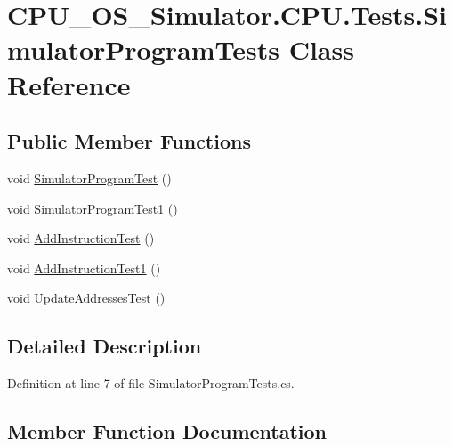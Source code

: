 \hypertarget{class_c_p_u___o_s___simulator_1_1_c_p_u_1_1_tests_1_1_simulator_program_tests}{}\section{C\+P\+U\+\_\+\+O\+S\+\_\+\+Simulator.\+C\+P\+U.\+Tests.\+Simulator\+Program\+Tests Class Reference}
\label{class_c_p_u___o_s___simulator_1_1_c_p_u_1_1_tests_1_1_simulator_program_tests}
\subsection*{Public Member Functions}
\begin{DoxyCompactItemize}
\item 
void \hyperlink{class_c_p_u___o_s___simulator_1_1_c_p_u_1_1_tests_1_1_simulator_program_tests_a86776e466d36e5138765fdf648211fc7}{Simulator\+Program\+Test} ()
\item 
void \hyperlink{class_c_p_u___o_s___simulator_1_1_c_p_u_1_1_tests_1_1_simulator_program_tests_a4bc06b230e557ec3bb036e33bea4b59a}{Simulator\+Program\+Test1} ()
\item 
void \hyperlink{class_c_p_u___o_s___simulator_1_1_c_p_u_1_1_tests_1_1_simulator_program_tests_a0abe728005b8d75576cc7cb5bac436c0}{Add\+Instruction\+Test} ()
\item 
void \hyperlink{class_c_p_u___o_s___simulator_1_1_c_p_u_1_1_tests_1_1_simulator_program_tests_ad708220fd97704b0807b1dfcbbfff6ad}{Add\+Instruction\+Test1} ()
\item 
void \hyperlink{class_c_p_u___o_s___simulator_1_1_c_p_u_1_1_tests_1_1_simulator_program_tests_a21f054ad89eae1b93628e9ea94a32092}{Update\+Addresses\+Test} ()
\end{DoxyCompactItemize}


\subsection{Detailed Description}


Definition at line 7 of file Simulator\+Program\+Tests.\+cs.



\subsection{Member Function Documentation}
\hypertarget{class_c_p_u___o_s___simulator_1_1_c_p_u_1_1_tests_1_1_simulator_program_tests_a0abe728005b8d75576cc7cb5bac436c0}{}
